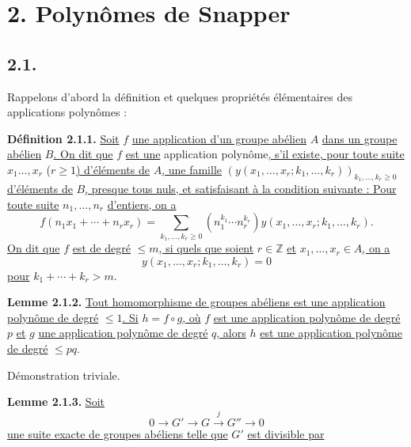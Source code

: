 
\section*{2. Polynômes de Snapper}

\subsection*{2.1.}
Rappelons d'abord la définition et quelques propriétés élémentaires des applications polynômes :

\textbf{Définition 2.1.1.} \uline{Soit} $f$ \uline{une application d'un groupe abélien} $A$ \uline{dans un groupe abélien} $B$\uline{. On dit que} $f$ \uline{est une} application polynôme\uline{, s'il existe, pour toute suite} $x_1\ldots,x_r$ ($r\geq1$\uline{) d'éléments de} $A$\uline{, une famille} $(y(x_1,\ldots,x_r;k_1,\ldots,k_r))_{k_1,\ldots,k_r\geq0}$ \uline{d'éléments de} $B$\uline{, presque tous nuls, et satisfaisant à la condition suivante : Pour toute suite} $n_1,\ldots,n_r$ \uline{d'entiers, on a}
\[
f(n_1x_1+\cdots+n_rx_r)=
\sum_{k_1,\ldots,k_r\geq0}(n_1^{k_1}\cdots n_r^{k_r})
y(x_1,\ldots,x_r;k_1,\ldots,k_r).
\]
\uline{On dit que} $f$ \uline{est de degré} $\leq m$\uline{, si quels que soient} $r\in\mathbb Z$ \uline{et} $x_1,\ldots,x_r\in A$\uline{, on a}
\[
y(x_1,\ldots,x_r;k_1,\ldots,k_r)=0
\]
\uline{pour} $k_1+\cdots+k_r>m$.

\textbf{Lemme 2.1.2.} \uline{Tout homomorphisme de groupes abéliens est une application polynôme de degré} $\leq1$\uline{. Si} $h=f\circ g$\uline{, où} $f$ \uline{est une application polynôme de degré} $p$ \uline{et} $g$ \uline{une application polynôme de degré} $q$\uline{, alors} $h$ \uline{est une application polynôme de degré} $\leq pq$.

Démonstration triviale.

\textbf{Lemme 2.1.3.} \uline{Soit}
\[
0\longrightarrow G'\longrightarrow G\xrightarrow{j}G''\longrightarrow0
\]
\uline{une suite exacte de groupes abéliens telle que} $G'$ \uline{est divisible par}
